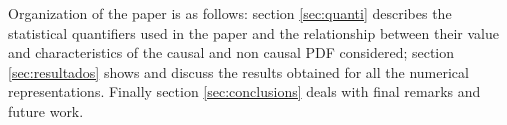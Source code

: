 Organization of the paper is as follows: section \ref{sec:quanti} describes the statistical quantifiers used in the paper and the relationship between their value and characteristics of the causal and non causal PDF considered; section \ref{sec:resultados} shows and discuss the results obtained for all the numerical representations.
Finally section \ref{sec:conclusions} deals with final remarks and future work.